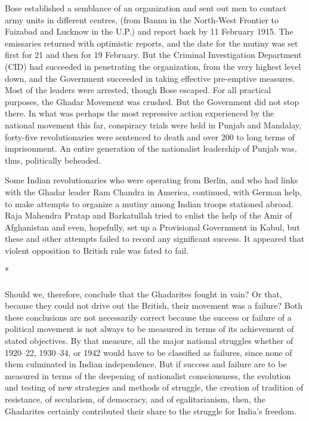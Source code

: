 Bose established a semblance of an organization and sent out men to contact army units in different centres, (from Bannu in the North-West Frontier to Faizabad and Lucknow in the U.P.) and report back by 11 February 1915. The emissaries returned with optimistic reports, and the date for the mutiny was set first for 21 and then for 19 February. But the Criminal Investigation Department (CID) had succeeded in penetrating the organization, from the very highest level down, and the Government succeeded in taking effective pre-emptive measures. Most of the leaders were arrested, though Bose escaped. For all practical purposes, the Ghadar Movement was crushed. But the Government did not stop there. In what was perhaps the most repressive action experienced by the national movement this far, conspiracy trials were held in Punjab and Mandalay, forty-five revolutionaries were sentenced to death and over 200 to long terms of imprisonment. An entire generation of the nationalist leadership of Punjab was, thus, politically beheaded.

Some Indian revolutionaries who were operating from Berlin, and who had links with the Ghadar leader Ram Chandra in America, continued, with German help, to make attempts to organize a mutiny among Indian troops stationed abroad. Raja Mahendra Pratap and Barkatullah tried to enlist the help of the Amir of Afghanistan and even, hopefully, set up a Provisional Government in Kabul, but these and other attempts failed to record any significant success. It appeared that violent opposition to British rule was fated to fail.

\begin{center}*\end{center}

\paragraph*{}

Should we, therefore, conclude that the Ghadarites fought in vain? Or that, because they could not drive out the British, their movement was a failure? Both these conclusions are not necessarily correct because the success or failure of a political movement is not always to be measured in terms of its achievement of stated objectives. By that measure, all the major national struggles whether of 1920--22, 1930--34, or 1942 would have to be classified as failures, since none of them culminated in Indian independence. But if success and failure are to be measured in terms of the deepening of nationalist consciousness, the evolution and testing of new strategies and methods of struggle, the creation of tradition of resistance, of secularism, of democracy, and of egalitarianism, then, the Ghadarites certainly contributed their share to the struggle for India's freedom.

